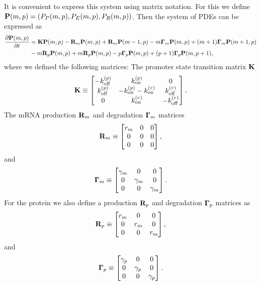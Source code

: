 It is convenient to express this system using matrix notation. For this we
define $\mathbf{P}(m, p) = (P_P(m, p), P_E(m, p), P_R(m, p))$. Then the system of PDEs
can be expressed as
\begin{equation}
  \begin{aligned}
    {\partial{\mathbf{P}(m, p)} \over \partial t} &= \mathbf{K} \mathbf{P}(m, p)
    - \mathbf{R}_m \mathbf{P}(m, p) + \mathbf{R}_m \mathbf{P}(m-1, p)
    - m \mathbf{\Gamma}_m \mathbf{P}(m, p) + (m + 1) \mathbf{\Gamma}_m \mathbf{P}(m + 1, p)\\
    &- m \mathbf{R}_p \mathbf{P}(m, p) + m \mathbf{R}_p \mathbf{P}(m, p)
    - p \mathbf{\Gamma}_p \mathbf{P}(m, p) + (p + 1) \mathbf{\Gamma}_p \mathbf{P}(m, p + 1),
  \end{aligned}
\end{equation}
where we defined the following matrices: The promoter state transition matrix
$\mathbf{K}$
\begin{align}
  \mathbf{K} \equiv
  \begin{bmatrix}
    -k^{(p)}_{\text{off}}   & k^{(p)}_{\text{on}}         & 0\\
    k^{(p)}_{\text{off}}    & -k^{(p)}_{\text{on}} -k^{(r)}_{\text{on}}  & k^{(r)}_{\text{off}}\\
    0         & k^{(r)}_{\text{on}}         & -k^{(r)}_{\text{off}}
  \end{bmatrix},
\end{align}
The mRNA production $\mathbf{R}_m$ and degradation $\mathbf{\Gamma}_m$ matrices
\begin{equation}
  \mathbf{R}_m \equiv
  \begin{bmatrix}
    r_m   & 0 & 0\\
    0     & 0 & 0\\
    0     & 0 & 0\\
  \end{bmatrix},
\end{equation}
and
\begin{equation}
  \mathbf{\Gamma}_m \equiv
  \begin{bmatrix}
    \gamma _m   & 0   & 0\\
    0     & \gamma _m & 0\\
    0     & 0   & \gamma _m\\
  \end{bmatrix}.
\end{equation}
For the protein we also define a production $\mathbf{R}_p$ and degradation $\mathbf{\Gamma}_p$ matrices
as
\begin{equation}
  \mathbf{R}_p \equiv
  \begin{bmatrix}
    r_m   & 0   & 0\\
    0     & r_m & 0\\
    0     & 0   & r_m\\
  \end{bmatrix},
\end{equation}
and
\begin{equation}
  \mathbf{\Gamma}_p \equiv
  \begin{bmatrix}
    \gamma _p   & 0   & 0\\
    0     & \gamma _p & 0\\
    0     & 0   & \gamma _p\\
  \end{bmatrix}.
\end{equation}

